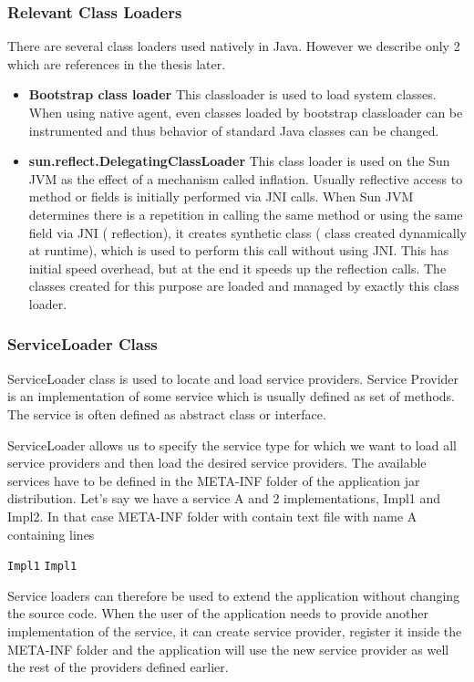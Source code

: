 \subsubsection{Relevant Class Loaders}
There are several class loaders used natively in Java. However we describe only 2 which are references in the thesis later. 

\begin{itemize}
	\item\textbf{ Bootstrap class loader} \newline
	This classloader is used to load system classes. When using native agent, even classes loaded by bootstrap classloader can be instrumented and thus behavior of standard Java classes can be changed.
	
	\item  \textbf{sun.reflect.DelegatingClassLoader} \newline
	This class loader is used on the Sun JVM as the effect of a mechanism called inflation. Usually reflective access to method or fields is initially performed via JNI calls. When Sun JVM determines there is a repetition in calling the same method or using the same field via JNI ( reflection), it creates synthetic class ( class created dynamically at runtime), which is used to perform this call without using JNI. This has initial speed overhead, but at the end it speeds up the reflection calls.
	The classes created for this purpose are loaded and managed by exactly this class loader. 
\end{itemize}
\subsubsection{ServiceLoader Class}
ServiceLoader class is used to locate and load service providers. Service Provider is an implementation of some service which is usually defined as set of methods. The service is often defined as abstract class or interface. 

ServiceLoader allows us to specify the service type for which we want to load all service providers and then load the desired service providers. The available services have to be defined in the META-INF folder of the application jar distribution. Let's say we have a service A and 2 implementations, Impl1 and Impl2. In that case META-INF folder with contain text file with name A containing lines
\begin{center}
 \texttt{Impl1} \newline
\texttt{Impl1}  \newline
\end{center}
Service loaders can therefore be used to extend the application without changing the source code. When the user of the application needs to provide another implementation of the service, it can create service provider, register it inside the META-INF folder and the application will use the new service provider as well the rest of the providers defined earlier.
